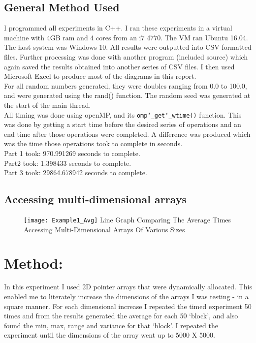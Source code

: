 \documentclass[11pt]{article}
\begin{document}
\begin{page}

\clearpage
\setcounter{page}{1}

\section{General Method Used}
I programmed all experiments in C++. I ran these experiments in a virtual machine with 4GB ram and 4 cores from an i7 4770. The VM ran Ubuntu 16.04. The host system was Windows 10. All results were outputted into CSV formatted files. Further processing was done with another program (included source) which again saved the results obtained into another series of CSV files. I then used Microsoft Excel to produce most of the diagrams in this report.\\

\noindent For all random numbers generated, they were doubles ranging from 0.0 to 100.0, and were generated using the rand() function. The random seed was generated at the start of the main thread.\\

\noindent All timing was done using openMP, and its \texttt{omp\char`_get\char`_wtime()} function. This was done by getting a start time before the desired series of operations and an end time after those operations were completed. A difference was produced which was the time those operations took to complete in seconds.\\

\noindent Part 1 took: 970.991269 seconds to complete.\\
Part2 took: 1.398433 seconds to complete.\\
Part 3 took: 29864.678942 seconds to complete.\\


\section{Accessing multi-dimensional arrays}
\begin{figure}[ht]
\centering
     \texttt{[image: Example1\_Avg]}
     Line Graph Comparing The Average Times Accessing Multi-Dimensional Arrays Of Various Sizes\\
\end{figure}

\noindent \chapter{Method:}
In this experiment I used 2D pointer arrays that were dynamically allocated. This enabled me to literately increase the dimensions of the arrays I was testing - in a square manner. For each dimensional increase I repeated the timed experiment 50 times and from the results generated the average for each 50 ‘block’, and also found the min, max, range and variance for that ‘block’. I repeated the experiment until the dimensions of the array went up to 5000 X 5000.\\


\end{page}
\end{document}
